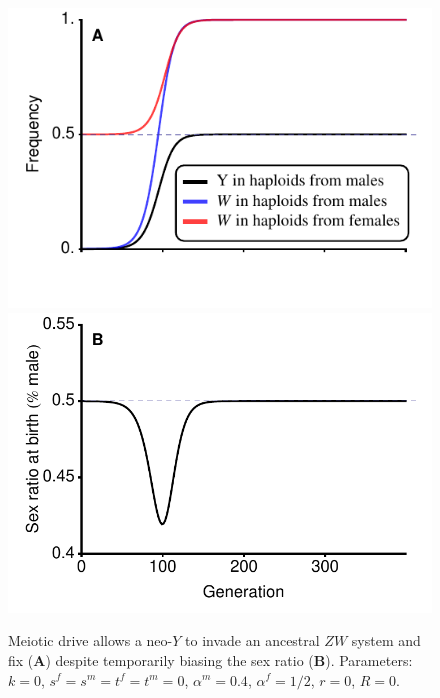 \documentclass[12pt]{article}
\begin{document}
\begin{figure}
\centering
\includegraphics[width=0.5\linewidth]{FreqWCounterKozi}\\
\includegraphics[width=0.5\linewidth]{SexRatioCounterKozi}\\
\caption{
Meiotic drive allows a neo-$Y$ to invade an ancestral $ZW$ system and fix (\textbf{A}) despite temporarily biasing the sex ratio (\textbf{B}). %
Parameters: $k=0$, $s^f = s^m = t^f = t^m = 0$, $\alpha^m = 0.4$, $\alpha^f = 1/2$, $r=0$, $R=0$.
}
\label{fig:CounterKozi}
\end{figure}
\end{document}
